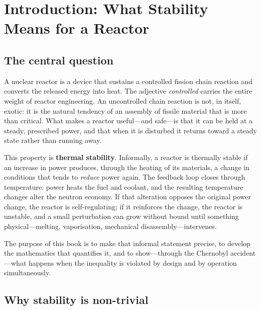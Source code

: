 \chapter{Introduction: What Stability Means for a Reactor}
\label{ch:intro}

\section{The central question}

A nuclear reactor is a device that sustains a controlled fission chain reaction
and converts the released energy into heat. The adjective \emph{controlled}
carries the entire weight of reactor engineering. An uncontrolled chain reaction
is not, in itself, exotic: it is the natural tendency of an assembly of fissile
material that is more than critical. What makes a reactor useful---and
safe---is that it can be held at a steady, prescribed power, and that when it is
disturbed it returns toward a steady state rather than running away.

This property is \textbf{thermal stability}. Informally, a reactor is thermally
stable if an increase in power produces, through the heating of its materials, a
change in conditions that tends to \emph{reduce} power again. The feedback loop
closes through temperature: power heats the fuel and coolant, and the resulting
temperature changes alter the neutron economy. If that alteration opposes the
original power change, the reactor is self-regulating; if it reinforces the
change, the reactor is unstable, and a small perturbation can grow without
bound until something physical---melting, vaporisation, mechanical
disassembly---intervenes.


The purpose of this book is to make that informal statement precise, to develop
the mathematics that quantifies it, and to show---through the Chernobyl
accident---what happens when the inequality is violated by design and by
operation simultaneously.

\section{Why stability is non-trivial}

